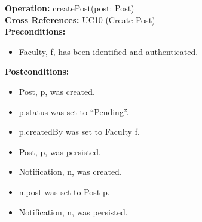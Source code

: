 \textbf{Operation:} createPost(post: Post) \\
\textbf{Cross References:} UC10 (Create Post) \\
\textbf{Preconditions:}
\begin{itemize}
    \item Faculty, f, has been identified and authenticated.
\end{itemize}
\textbf{Postconditions:}
\begin{itemize}
    \item Post, p, was created.
    \item p.status was set to “Pending”.
    \item p.createdBy was set to Faculty f.
    \item Post, p, was persisted.
    \item Notification, n, was created.
    \item n.post was set to Post p.
    \item Notification, n, was persisted.
\end{itemize}